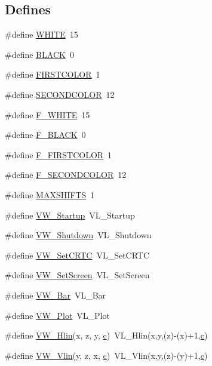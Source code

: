 \subsection*{Defines}
\begin{DoxyCompactItemize}
\item 
\#define \hyperlink{ID__VH_8H_a87b537f5fa5c109d3c05c13d6b18f382}{WHITE}~15
\item 
\#define \hyperlink{ID__VH_8H_a7b3b25cba33b07c303f3060fe41887f6}{BLACK}~0
\item 
\#define \hyperlink{ID__VH_8H_a7ee649043831bcc7dc8402909590ab0d}{FIRSTCOLOR}~1
\item 
\#define \hyperlink{ID__VH_8H_ae0a44e30cf324589e3ea42da1608d8b7}{SECONDCOLOR}~12
\item 
\#define \hyperlink{ID__VH_8H_adef0c268dde9d7141995af9c26650ed8}{F\_\-WHITE}~15
\item 
\#define \hyperlink{ID__VH_8H_a3461360dbb2ddad643d0d906fedf900c}{F\_\-BLACK}~0
\item 
\#define \hyperlink{ID__VH_8H_aa5e0d04e9fe2f4f099ca5fdf04dc2129}{F\_\-FIRSTCOLOR}~1
\item 
\#define \hyperlink{ID__VH_8H_afce016b8339bdc6eee8ff614a30a2e13}{F\_\-SECONDCOLOR}~12
\item 
\#define \hyperlink{ID__VH_8H_a61fc4b21f3668efb4e1a4cc2508bccab}{MAXSHIFTS}~1
\item 
\#define \hyperlink{ID__VH_8H_ab552693286069f2b8cb256491bed2023}{VW\_\-Startup}~VL\_\-Startup
\item 
\#define \hyperlink{ID__VH_8H_a6f6b55b17e7663ca72f0d5ccf2a867e5}{VW\_\-Shutdown}~VL\_\-Shutdown
\item 
\#define \hyperlink{ID__VH_8H_ae207cd9a9b77b1e6c04984fdd5b707a1}{VW\_\-SetCRTC}~VL\_\-SetCRTC
\item 
\#define \hyperlink{ID__VH_8H_a36b48fa03f839fbf2863a9d6c4699940}{VW\_\-SetScreen}~VL\_\-SetScreen
\item 
\#define \hyperlink{ID__VH_8H_a924aa34c6a3cf4efe053305531a0e222}{VW\_\-Bar}~VL\_\-Bar
\item 
\#define \hyperlink{ID__VH_8H_aca69acdcdaa8f0173ed5e994537e2154}{VW\_\-Plot}~VL\_\-Plot
\item 
\#define \hyperlink{ID__VH_8H_a9e4bfc81697f8b787245b53d54e2fcc8}{VW\_\-Hlin}(x, z, y, \hyperlink{ID__VH_8C_a6a23f31bb58d6a932349aa926c720e47}{c})~VL\_\-Hlin(x,y,(z)-\/(x)+1,\hyperlink{ID__VH_8C_a6a23f31bb58d6a932349aa926c720e47}{c})
\item 
\#define \hyperlink{ID__VH_8H_a389584cb4e0f61a5b3bd9cdc48334404}{VW\_\-Vlin}(y, z, x, \hyperlink{ID__VH_8C_a6a23f31bb58d6a932349aa926c720e47}{c})~VL\_\-Vlin(x,y,(z)-\/(y)+1,\hyperlink{ID__VH_8C_a6a23f31bb58d6a932349aa926c720e47}{c})

\end{DoxyCompactItemize}
